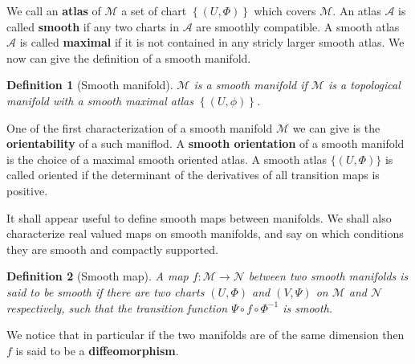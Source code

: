 \documentclass[10pt]{book}
\newcommand{\Acal}{\mathcal{A}}
\newcommand{\Mcal}{\mathcal{M}}
\newcommand{\Ncal}{\mathcal{N}}
\theoremstyle{break}
\newtheorem{definition}{Definition}
\begin{document}
\bigskip


We call an \textbf{atlas} of $\Mcal$ a set of chart $\left\{ (U, \Phi) \right\}$ which covers $\Mcal$. An atlas $\Acal$ is called \textbf{smooth}  if any two charts in $\Acal$ are smoothly compatible. A smooth atlas $\Acal$ is called \textbf{maximal}  if it is not contained in any stricly larger smooth atlas. We now can give the definition of a smooth manifold.


\begin{definition}[Smooth manifold]
$\Mcal$ is a smooth manifold if $\Mcal$ is a topological manifold with a smooth maximal atlas $\left\{(U,\phi)\right\}$.
\end{definition}


One of the first characterization of a smooth manifold $\Mcal$ we can give is the \textbf{orientability} of a such maniflod. A \textbf{smooth orientation} of a smooth manifold is the choice of a maximal smooth oriented atlas. A smooth atlas $\{(U,\Phi)\}$ is called oriented if the determinant of the derivatives of all transition maps is positive. 


\bigskip


It shall appear useful to define smooth maps between manifolds. We shall also characterize real valued maps on smooth manifolds, and say on which conditions they are smooth and compactly supported.


\begin{definition}[Smooth map]
A map $f : \Mcal \to \Ncal$ between two smooth manifolds is said to be smooth if there are two charts $(U,\Phi)$ and $(V,\Psi)$ on $\Mcal$ and $\Ncal$ respectively, such that the transition function $\Psi \circ f \circ \Phi^{-1}$ is  smooth.
\end{definition}


We notice that in particular if the two manifolds are of the same dimension then $f$ is said to be a \textbf{diffeomorphism}.
\end{document}
